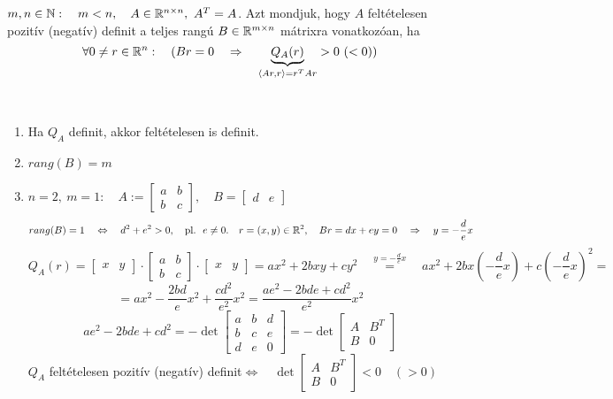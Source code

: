 \documentclass[a4paper,11.5pt]{article}
\begin{document}
	\begin{definition}
		$m,n\in\mathbb{N}:\quad m<n,\quad A\in\mathbb{R}^{n\times n},\ A^T=A$. Azt mondjuk, hogy $A$ feltételesen pozitív (negatív) definit a teljes rangú $B\in\mathbb{R}^{m\times n}$ mátrixra vonatkozóan, ha
		\[ \forall 0\not=r\in\R^n:\quad (Br=0\quad \Rightarrow\quad \underbrace{Q_A(r)}_{\langle Ar,r\rangle=r^TAr}>0\ (<0)) \]
	\end{definition}
	\begin{note}\ 
		
		\begin{enumerate}
			\item Ha $Q_A$ definit, akkor feltételesen is definit.
			
			\item $rang(B)=m$
			
			\item $n=2,\ m=1:\quad A:=\begin{bmatrix}
				a&b\\
				b&c				
			\end{bmatrix},\quad B=\begin{bmatrix}
				d&e
			\end{bmatrix}$
			\[ rang(B)=1\quad \Leftrightarrow\quad d^2+e^2>0,\quad \text{pl.\ \ }e\not=0.\quad r=(x,y)\in\mathbb{R}^2,\quad Br=dx+ey=0\quad \Rightarrow\quad y=-\frac{d}{e}x \]
			\[ Q_A(r)=\begin{bmatrix}
				x&y
			\end{bmatrix}\cdot\begin{bmatrix}
				a&b\\
				b&c
			\end{bmatrix}\cdot\begin{bmatrix}
				x&y
			\end{bmatrix}=ax^2+2bxy+cy^2\quad \overset{y=-\frac{d}{e}x}{=}\quad ax^2+2bx\left(-\frac{d}{e}x\right)+c\left(-\frac{d}{e}x\right)^2=\]
			\[=ax^2-\frac{2bd}{e}x^2+\frac{cd^2}{e^2}x^2=\frac{ae^2-2bde+cd^2}{e^2}x^2 \]
			\[ ae^2-2bde+cd^2=-\det \begin{bmatrix}
				a&b&d\\
				b&c&e\\
				d&e&0
			\end{bmatrix}=-\det \begin{bmatrix}
				A&B^T\\
				B&0
			\end{bmatrix} \]
			$Q_A$ feltételesen pozitív (negatív) definit\quad $\Leftrightarrow\quad \det \begin{bmatrix}
				A&B^T\\
				B&0
			\end{bmatrix}<0\quad (>0)$
			

\end{enumerate}
\end{note}
\end{document}
